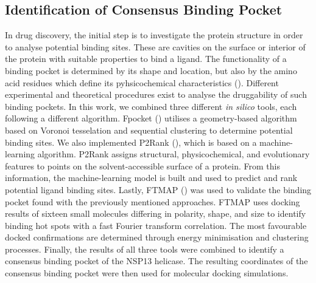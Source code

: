 \documentclass[11pt, letterpaper, titlepage]{article}
\begin{document}
\subsection{Identification of Consensus Binding Pocket}
In drug discovery, the initial step is to investigate the protein structure in order to analyse potential binding sites. These are cavities on the surface or interior of the protein with suitable properties to bind a ligand. The functionality of a binding pocket is determined by its shape and location, but also by the amino acid residues which define its pyhsicochemical characteristics (\cite{Stank_2016}). 
Different experimental and theoretical procedures exist to analyse the druggability of such binding pockets. In this work, we combined three different \textit{in silico} tools, each following a different algorithm. Fpocket (\cite{package_Fpocket}) utilises a geometry-based algorithm based on Voronoi tesselation and sequential clustering to determine potential binding sites. We also implemented P2Rank (\cite{package_P2Rank, package_PrankWeb, package_PrankWeb3}), which is based on a machine-learning algorithm. 
P2Rank assigns structural, physicochemical, and evolutionary features to points on the solvent-accessible surface of a protein. From this information, the machine-learning model is built and used to predict and rank potential ligand binding sites. Lastly, FTMAP (\cite{package_FTMAP}) was used to validate the binding pocket found with the previously mentioned approaches. FTMAP uses docking results of sixteen small molecules differing in polarity, shape, and size to identify binding hot spots with a fast Fourier transform correlation. The most favourable docked confirmations are determined through energy minimisation and clustering processes.
Finally, the results of all three tools were combined to identify a consensus binding pocket of the NSP13 helicase. The resulting coordinates of the consensus binding pocket were then used for molecular docking simulations. 
\end{document}
